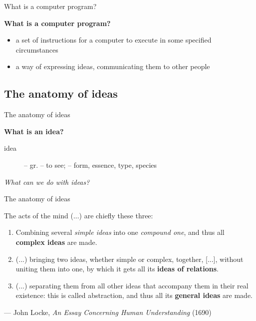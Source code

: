 \documentclass{beamer}
\begin{document}
\begin{frame}{What is a computer program?}

  \textbf{What is a computer program?}
  \begin{itemize}
  \item
    a set of instructions for a computer to execute
    in some specified circumstances
    \pause
  \item
    a way of expressing ideas, communicating them to other people
  \end{itemize}
\end{frame}

\subsection{The anatomy of ideas}

\begin{frame}{The anatomy of ideas}

  \textbf{What is an idea?}
  \pause
  \begin{description}
  \item [idea] -- gr. \textiota\textdelta\textepsilon\textiota\textnu -- to see;
    \textepsilon\textiota\textdelta\textomikron\textvarsigma -- form, essence,
    type, species
  \end{description}
  \pause
  \textit{What can we do with ideas?}
  
\end{frame}

\begin{frame}{The anatomy of ideas}

  \begin{displayquote}
    The acts of the mind (...) are chiefly these three:
    \begin{enumerate}
    \item <2-> Combining several \textit{simple ideas} into one
      \textit{compound one}, and thus all \textbf{complex ideas} are made.
    \item <3-> (...) bringing two ideas, whether simple or complex, together,
      [...], without uniting them into one, by which it gets all its
      \textbf{ideas of relations}.
    \item <4-> (...) separating them from all other ideas that accompany them
      in their real existence: this is called abstraction, and thus all
      its \textbf{general ideas} are made.
    \end{enumerate}
  \end{displayquote}
  --- John Locke, \textit{An Essay Concerning Human Understanding} (1690)
  
\end{frame}
\end{document}
